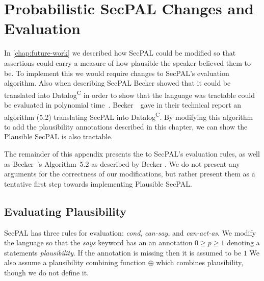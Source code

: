 
\chapter{Probabilistic SecPAL Changes and Evaluation}
\label{appendix:probabilistic}

In \autoref{chap:future-work} we described how SecPAL could be modified so that
assertions could carry a measure of how plausible the speaker believed them to
be. To implement this we would require changes to SecPAL's evaluation algorithm.
Also when describing SecPAL Becker showed that it could be translated into
Datalog\textsuperscript{C} in order to show that the language was tractable
could be evaluated in polynomial time~\cite{becker_secpal:_2010}.
Becker~\etal~gave in their technical report an algorithm (5.2) translating
SecPAL into Datalog\textsuperscript{C}. By modifying this algorithm to add the
plausibility annotations described in this chapter, we can show the Plausible
SecPAL is also tractable.

 The remainder of this appendix presents the  to SecPAL's
evaluation rules, as well as Becker~\etal{}'s Algorithm~5.2 \textsf{as described
by Becker }. We do not present any
arguments for the correctness of our modifications, but rather present them as a
tentative first step towards implementing Plausible SecPAL.

\section{Evaluating Plausibility}

SecPAL has three rules for evaluation: \emph{cond}, \emph{can-say},
and \emph{can-act-as}.  We modify the language so that the \emph{says}
keyword has an an annotation $0 \geq p \geq 1$ denoting a statements
\emph{plausibility}.  If the annotation is missing then it is assumed
to be $1$ We also assume a plausibility combining function $\oplus$
which combines plausibility, though we do not define it.

